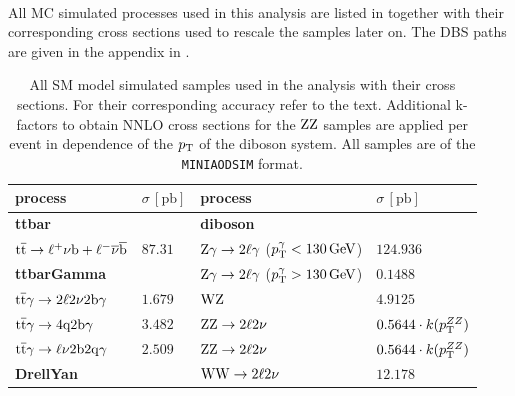 \\
All MC simulated processes used in this analysis are listed in  together with their corresponding cross sections used to rescale the samples later on. The DBS paths are given in the appendix in .\\

\begin{table}[htb]
 \centering
 \caption{All SM model simulated samples used in the analysis with their cross sections. For their corresponding accuracy refer to the text. Additional k-factors to obtain NNLO cross sections for the $\mathrm{Z}\mathrm{Z}$ samples are applied per event in dependence of the $p_{\mathrm{T}}$ of the diboson system. All samples are of the \texttt{MINIAODSIM} format.}
 \label{tab:MCsamples}
 \begin{tabular}[width=\textwidth]{ll|ll}
  \hline
  \normalsize{process}                             & \normalsize{$\sigma\,[\mathrm{pb}]$} & \normalsize{process}                         & \normalsize{$\sigma\,[\mathrm{pb}]$} \\\hline
  \scriptsize{\textbf{ttbar}}                      &                                      & \scriptsize{\textbf{diboson}}                &                                      \\
  ${\mathrm{t}\overline{\mathrm{t}}}\to\ell^{+}\nu\mathrm{b}+\ell^{-}\overline{\nu}\overline{\mathrm{b}}$ & $87.31$                              & $\mathrm{Z}\gamma\to2\ell\gamma$ ($p_{\mathrm{T}}^{\gamma}<130\,\text{Ge\hspace{-.08em}V}$) & $124.936$                            \\
  \scriptsize{\textbf{ttbarGamma}}                 &                                      & $\mathrm{Z}\gamma\to2\ell\gamma$ ($p_{\mathrm{T}}^{\gamma}>130\,\text{Ge\hspace{-.08em}V}$) & $0.1488$                             \\
  ${\mathrm{t}\overline{\mathrm{t}}}\gamma\to2\ell2\nu2\mathrm{b}\gamma$              & $1.679$                              & $\mathrm{W}\mathrm{Z}$                                     & $4.9125$                             \\
  ${\mathrm{t}\overline{\mathrm{t}}}\gamma\to4\mathrm{q}2\mathrm{b}\gamma$                   & $3.482$                              & $\mathrm{Z}\mathrm{Z}\to2\ell2\nu$                        & $0.5644\cdot k(p_{\mathrm{T}}^{ZZ})$            \\
  ${\mathrm{t}\overline{\mathrm{t}}}\gamma\to\ell\nu2\mathrm{b}2\mathrm{q}\gamma$           & $2.509$                              & $\mathrm{Z}\mathrm{Z}\to2\ell2\nu$                        & $0.5644\cdot k(p_{\mathrm{T}}^{ZZ})$            \\
  \scriptsize{\textbf{DrellYan}}                   &                                      & $\mathrm{W}\mathrm{W}\to2\ell2\nu$                        & $12.178$                             \\

\end{tabular}
\end{table}
